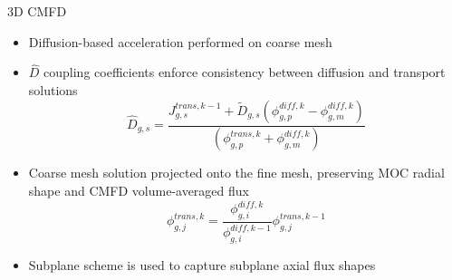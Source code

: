 \begin{frame}[t]{3D CMFD}
    
        \begin{itemize}
          \item Diffusion-based acceleration performed on coarse mesh
          \item $\hat{D}$ coupling coefficients enforce consistency between diffusion and transport solutions
          \begin{equation*}\scriptstyle
          \hat{D}_{g,s} = \frac{J_{g,s}^{trans,k-1} + 
            \tilde{D}_{g,s}\left(\phi_{g,p}^{diff,k} - 
            \phi_{g,m}^{diff,k}\right)}{\left(\phi_{g,p}^{trans,k} + 
            \phi_{g,m}^{diff,k}\right)}
          \end{equation*}
          \item Coarse mesh solution projected onto the fine mesh, preserving MOC radial shape and CMFD volume-averaged flux
          \begin{equation*}\scriptstyle
          \phi_{g,j}^{trans,k} = \frac{\phi_{g,i}^{diff,k}}{\phi_{g,i}^{diff,k-1}} \phi_{g,j}^{trans,k-1}
          \end{equation*}
          \item Subplane scheme is used to capture subplane axial flux shapes
        \end{itemize}
    
\end{frame}


